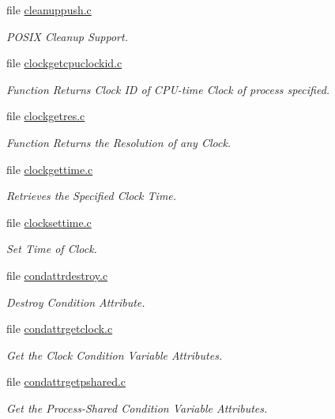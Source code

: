 \begin{DoxyCompactItemize}
file \mbox{\hyperlink{cleanuppush_8c}{cleanuppush.\+c}}
\begin{DoxyCompactList}\small\item\em P\+O\+S\+IX Cleanup Support. \end{DoxyCompactList}\item 
file \mbox{\hyperlink{clockgetcpuclockid_8c}{clockgetcpuclockid.\+c}}
\begin{DoxyCompactList}\small\item\em Function Returns Clock ID of C\+P\+U-\/time Clock of process specified. \end{DoxyCompactList}\item 
file \mbox{\hyperlink{clockgetres_8c}{clockgetres.\+c}}
\begin{DoxyCompactList}\small\item\em Function Returns the Resolution of any Clock. \end{DoxyCompactList}\item 
file \mbox{\hyperlink{clockgettime_8c}{clockgettime.\+c}}
\begin{DoxyCompactList}\small\item\em Retrieves the Specified Clock Time. \end{DoxyCompactList}\item 
file \mbox{\hyperlink{clocksettime_8c}{clocksettime.\+c}}
\begin{DoxyCompactList}\small\item\em Set Time of Clock. \end{DoxyCompactList}\item 
file \mbox{\hyperlink{condattrdestroy_8c}{condattrdestroy.\+c}}
\begin{DoxyCompactList}\small\item\em Destroy Condition Attribute. \end{DoxyCompactList}\item 
file \mbox{\hyperlink{condattrgetclock_8c}{condattrgetclock.\+c}}
\begin{DoxyCompactList}\small\item\em Get the Clock Condition Variable Attributes. \end{DoxyCompactList}\item 
file \mbox{\hyperlink{condattrgetpshared_8c}{condattrgetpshared.\+c}}
\begin{DoxyCompactList}\small\item\em Get the Process-\/\+Shared Condition Variable Attributes. \end{DoxyCompactList}\item 

\end{DoxyCompactItemize}
